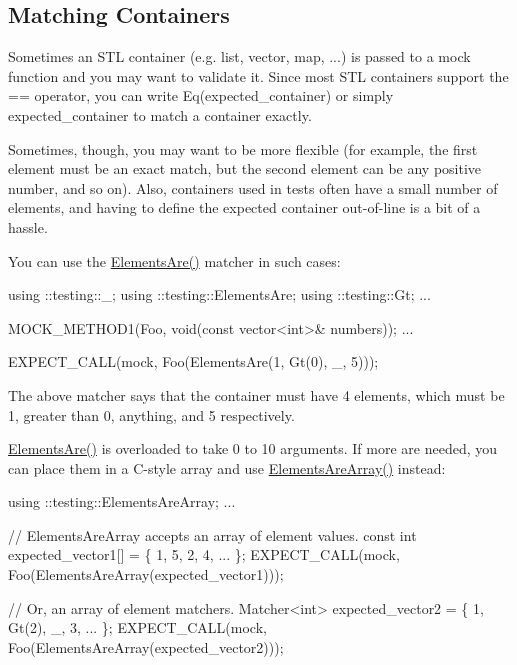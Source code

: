 \subsection*{Matching Containers}

Sometimes an S\+TL container (e.\+g. list, vector, map, ...) is passed to a mock function and you may want to validate it. Since most S\+TL containers support the {\ttfamily ==} operator, you can write {\ttfamily Eq(expected\+\_\+container)} or simply {\ttfamily expected\+\_\+container} to match a container exactly.

Sometimes, though, you may want to be more flexible (for example, the first element must be an exact match, but the second element can be any positive number, and so on). Also, containers used in tests often have a small number of elements, and having to define the expected container out-\/of-\/line is a bit of a hassle.

You can use the {\ttfamily \hyperlink{namespacetesting_a79cf4ae694bf8231dcf283b325405f27}{Elements\+Are()}} matcher in such cases\+:


\begin{DoxyCode}
using ::testing::\_;
using ::testing::ElementsAre;
using ::testing::Gt;
...

  MOCK\_METHOD1(Foo, void(const vector<int>& numbers));
...

  EXPECT\_CALL(mock, Foo(ElementsAre(1, Gt(0), \_, 5)));
\end{DoxyCode}


The above matcher says that the container must have 4 elements, which must be 1, greater than 0, anything, and 5 respectively.

{\ttfamily \hyperlink{namespacetesting_a79cf4ae694bf8231dcf283b325405f27}{Elements\+Are()}} is overloaded to take 0 to 10 arguments. If more are needed, you can place them in a C-\/style array and use {\ttfamily \hyperlink{namespacetesting_ae2eee06e7ddbf5f5372fd24372e9703f}{Elements\+Are\+Array()}} instead\+:


\begin{DoxyCode}
using ::testing::ElementsAreArray;
...

  // ElementsAreArray accepts an array of element values.
  const int expected\_vector1[] = \{ 1, 5, 2, 4, ... \};
  EXPECT\_CALL(mock, Foo(ElementsAreArray(expected\_vector1)));

  // Or, an array of element matchers.
  Matcher<int> expected\_vector2 = \{ 1, Gt(2), \_, 3, ... \};
  EXPECT\_CALL(mock, Foo(ElementsAreArray(expected\_vector2)));
\end{DoxyCode}


